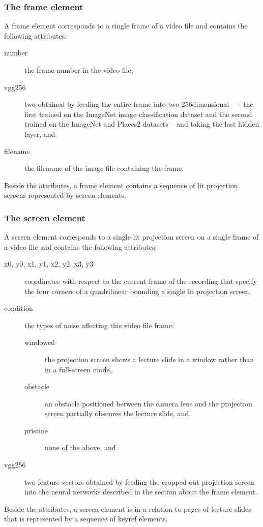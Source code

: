 \subsubsection*{The frame element}
A frame element corresponds to a single frame of a video file and contains the
following attributes:
\begin{description}
  \item[number] the frame number in the video file,
  \item[vgg256] two  obtained by feeding the
    entire frame into two 256dimensional ~\cite{simonyan2014very} -- the first trained on the ImageNet%
     image
    classification dataset and the second trained on the ImageNet and
    Places2
    datasets -- and taking the last hidden layer, and
  \item[filename] the filename of the image file containing the frame.
\end{description}
Beside the attributes, a frame element contains a sequence of lit projection
screens represented by screen elements.

\subsubsection*{The screen element}
A screen element corresponds to a single lit projection screen on a single
frame of a video file and contains the following attributes:
\begin{description}
  \item[x0\textmd, y0\textmd, x1\textmd, y1\textmd, x2\textmd, y2\textmd,
        x3\textmd, y3] coordinates with respect to the current frame
    of the recording that specify the four corners of a quadrilinear
    bounding a single lit projection screen,
  \item[condition] the types of noise affecting this video file frame:
    \begin{description}
      \item[windowed] the projection screen shows a lecture slide in a window
        rather than in a full-screen mode,
      \item[obstacle] an obstacle positioned between the camera lens and the
        projection screen partially obscures the lecture slide, and
      \item[pristine] none of the above, and
    \end{description}
  \item[vgg256] two  feature vectors obtained by feeding the
    cropped-out projection screen into the neural networks described in
    the section about the frame element.
\end{description}
Beside the attributes, a screen element is in a relation to pages of lecture
slides that is represented by a sequence of keyref elements.

